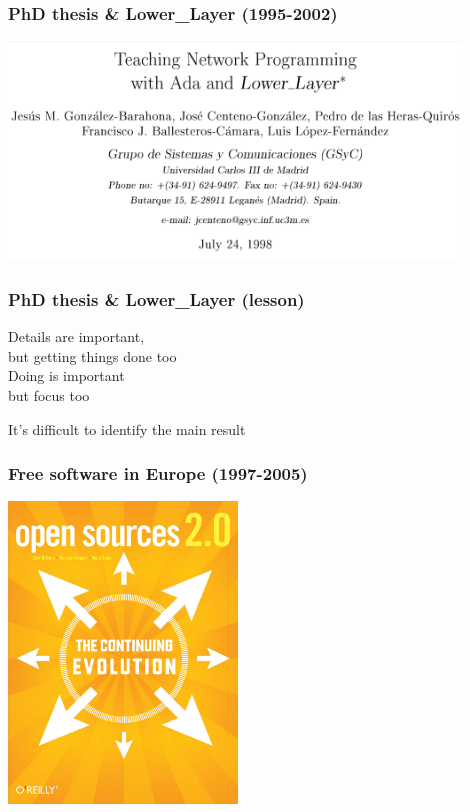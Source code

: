 \documentclass[17pt,aspectratio=169,hyperref=pdfusetitle]{beamer}
\begin{document}
\begin{frame}[fragile]
  \frametitle{PhD thesis \& Lower\_Layer (1995-2002)}

  \begin{center}
  \includegraphics[width=12cm]{figs/lower-layer}
  \end{center}  
  
\end{frame}

\begin{frame}[fragile]
  \frametitle{PhD thesis \& Lower\_Layer (lesson)}

  Details are important, \\
  but getting things done too \\
  Doing is important \\
  but focus too \\
  
  \begin{center}
    It's difficult to identify the main result
  \end{center}  
  
\end{frame}

\begin{frame}[fragile]
  \frametitle{Free software in Europe (1997-2005)}

  \begin{center}
  \includegraphics[height=8cm]{figs/opensources}
  \end{center}  
  
\end{frame}
\end{document}
